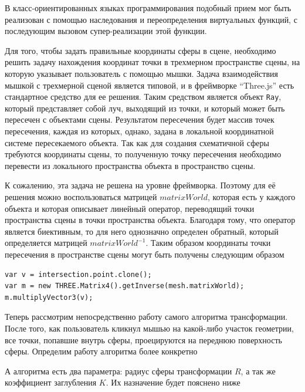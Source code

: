 \documentclass[12pt, a4paper]{article}
\begin{document}
В класс-ориентированных языках программирования подобный прием мог быть
реализован с помощью наследования и переопределения
виртуальных функций, с последующим вызовом супер-реализации этой функции.

Для того, чтобы задать правильные координаты сферы в сцене, необходимо решить
задачу нахождения координат точки в трехмерном пространстве сцены, на которую
указывает пользователь с помощью мышки. Задача взаимодействия
мышкой с трехмерной сценой является типовой, и в фреймворке ``Three.js'' есть
стандартное
средство для ее решения. Таким средством является объект \texttt{Ray}, который
представляет собой луч, выходящий из точки, и который может быть пересечен с
объектами сцены. Результатом пересечения будет массив точек пересечения,
каждая из которых, однако, задана в локальной координатной системе пересекаемого
объекта. Так как для создания схематичной сферы требуются координаты сцены, то
полученную точку пересечения необходимо перевести из локального пространства
объекта в пространство сцены.

К сожалению, эта задача не решена на уровне фреймворка. Поэтому для её решения
можно
воспользоваться матрицей $matrixWorld$, которая
есть у каждого объекта и которая описывает линейный оператор, переводящий точки
пространства сцены в точки пространства объекта. Благодаря тому, что оператор
является биективным, то для него однозначно определен обратный, который
определяется матрицей $matrixWorld^{-1}$. Таким образом
координаты точки пересечения в пространстве сцены могут быть получены следующим
образом

\begin{lstlisting}
var v = intersection.point.clone();
var m = new THREE.Matrix4().getInverse(mesh.matrixWorld);
m.multiplyVector3(v);
\end{lstlisting}

Теперь рассмотрим непосредственно работу самого алгоритма трансформации. После
того, как пользователь кликнул мышью на какой-либо участок геометрии, все точки,
попавшие внутрь сферы, проецируются на переднюю поверхность сферы. Определим
работу алгоритма более конкретно

А алгоритма есть два параметра: радиус сферы трансформации $R$, а так же
коэффициент заглубления $K$. Их назначение будет пояснено ниже
\end{document}
